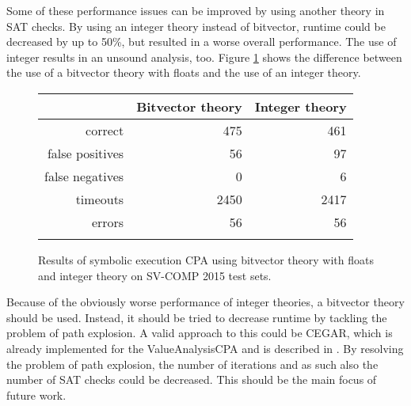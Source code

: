 Some of these performance issues can be improved by using another theory in SAT checks.
By using an integer theory instead of bitvector, runtime could be decreased by up to 50\%, but resulted in a worse overall performance.
The use of integer results in an unsound analysis, too. Figure \ref{bitvecIntComp} shows the difference between the use of a bitvector theory with floats and the use of an integer theory.
\begin{figure}
\begin{tabular}{| r || r | r |}
\hline
& Bitvector theory & Integer theory \\ \hline
correct         &  475 &  461 \\ \hline
false positives &   56 &   97 \\ \hline
false negatives &    0 &    6 \\ \hline
timeouts        & 2450 & 2417 \\ \hline
errors          &   56 &   56 \\ \hline
                & & \\ \hline
\end{tabular}
\caption{Results of symbolic execution CPA using bitvector theory with floats and integer theory on SV-COMP 2015 test sets.}
\label{bitvecIntComp}
\end{figure}

Because of the obviously worse performance of integer theories, a bitvector theory should be used.
Instead, it should be tried to decrease runtime by tackling the problem of path explosion.
A valid approach to this could be CEGAR, which is already implemented for the ValueAnalysisCPA and is described in \cite{Beyer2012}.
By resolving the problem of path explosion, the number of iterations and as such also the number of SAT checks could be decreased.
This should be the main focus of future work.
